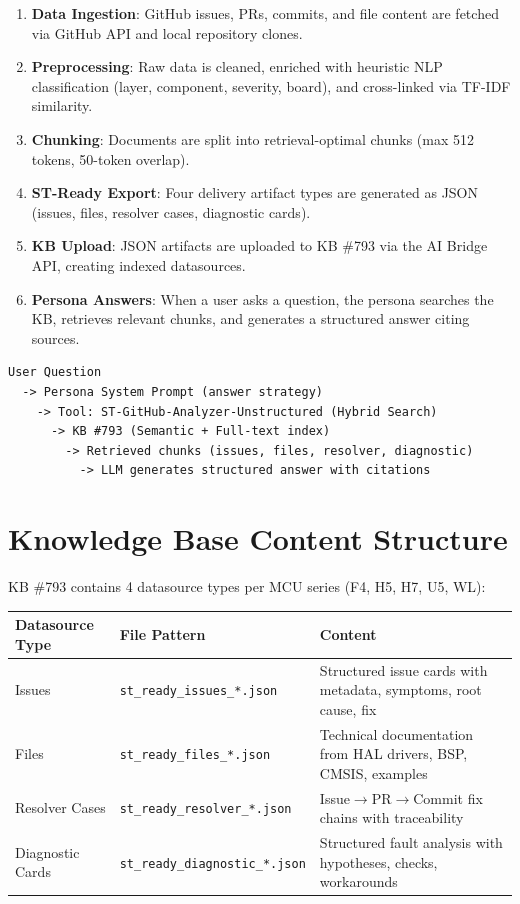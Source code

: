 \documentclass[12pt,a4paper]{report}
\begin{document}
\begin{enumerate}
  \item \textbf{Data Ingestion}: GitHub issues, PRs, commits, and file content are fetched via GitHub API and local repository clones.
  \item \textbf{Preprocessing}: Raw data is cleaned, enriched with heuristic NLP classification (layer, component, severity, board), and cross-linked via TF-IDF similarity.
  \item \textbf{Chunking}: Documents are split into retrieval-optimal chunks (max 512 tokens, 50-token overlap).
  \item \textbf{ST-Ready Export}: Four delivery artifact types are generated as JSON (issues, files, resolver cases, diagnostic cards).
  \item \textbf{KB Upload}: JSON artifacts are uploaded to KB \#793 via the AI Bridge API, creating indexed datasources.
  \item \textbf{Persona Answers}: When a user asks a question, the persona searches the KB, retrieves relevant chunks, and generates a structured answer citing sources.
\end{enumerate}

\begin{verbatim}
User Question
  -> Persona System Prompt (answer strategy)
    -> Tool: ST-GitHub-Analyzer-Unstructured (Hybrid Search)
      -> KB #793 (Semantic + Full-text index)
        -> Retrieved chunks (issues, files, resolver, diagnostic)
          -> LLM generates structured answer with citations
\end{verbatim}

\section{Knowledge Base Content Structure}

KB \#793 contains 4 datasource types per MCU series (F4, H5, H7, U5, WL):

\begin{longtable}{p{4cm}p{4cm}p{5cm}}
\toprule
\textbf{Datasource Type} & \textbf{File Pattern} & \textbf{Content} \\
\midrule
Issues & \texttt{st\_ready\_issues\_*.json} & Structured issue cards with metadata, symptoms, root cause, fix \\
Files & \texttt{st\_ready\_files\_*.json} & Technical documentation from HAL drivers, BSP, CMSIS, examples \\
Resolver Cases & \texttt{st\_ready\_resolver\_*.json} & Issue$\to$PR$\to$Commit fix chains with traceability \\
Diagnostic Cards & \texttt{st\_ready\_diagnostic\_*.json} & Structured fault analysis with hypotheses, checks, workarounds \\
\bottomrule
\end{longtable}
\end{document}
